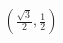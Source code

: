 \documentclass[preview]{standalone}
\begin{document}
\begin{align*}
\left(\frac{\sqrt{3}}{2}, \frac{1}{2}\right)
\end{align*}
\end{document}
